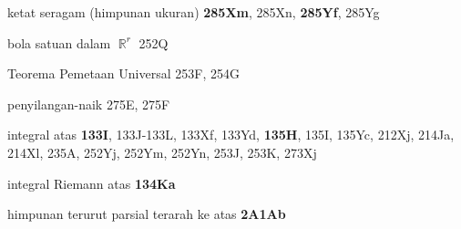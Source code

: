 ketat seragam 
(himpunan ukuran) {\bf 285Xm}, 285Xn, {\bf 285Yf}, 285Yg









bola satuan dalam $\BbbR^r$ 252Q












Teorema Pemetaan Universal 253F, 254G
































penyilangan-naik 275E, 275F
















integral atas {\bf 133I}, 133J-133L, 
133Xf, 133Yd, {\bf 135H}, 135I, 135Yc,
  212Xj, 214Ja, 214Xl, 235A, 252Yj, 252Ym, 252Yn, 253J, 253K, 273Xj

integral Riemann atas {\bf 134Ka}













himpunan terurut parsial terarah ke atas
{\bf 2A1Ab}
















